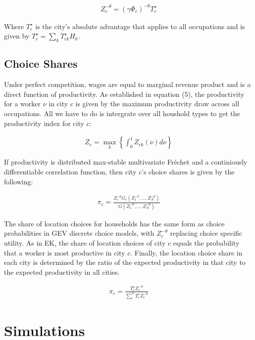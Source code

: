 \documentclass[10pt]{article}
\begin{document}
\begin{align}
    Z_c^{-\theta} = (\gamma \Phi_c)^{-\theta} T_c^{\star}
\end{align}

Where $T_c^{\star}$ is the city's absolute advantage that applies to all occupations and is given by $T_c^{\star} = \sum_{k}^{} T_{ck}^{\star} H_k$.

\subsection{Choice Shares}

Under perfect competition, wages are equal to marginal revenue product and is a direct function of productivity. As established in equation (5), the productivity for a worker $\nu$ in city $c$ is given by the maximum productivity draw across all occupations. All we have to do is intergrate over all houshold types to get the productivity index for city $c$:

\begin{align}
    Z_c = \max_k \left\{ \int_{0}^{1} Z_{ck} (\nu) d\nu \right\}
\end{align}

If productivity is distributed max-stable multivariate Fréchet and a continiously differentiable correlation function, then city $c$'s choice shares is given by the following:

\begin{align}
    \pi_c = \frac{Z_c^{-\theta} G_c(Z_1^{-\theta}, \dots, Z_N^{-\theta})}{G(Z_1^{-\theta}, \dots, Z_N^{-\theta})}
\end{align}

The share of location choices for households has the same form as choice probabilities in GEV discrete choice models, with $Z_c^{-\theta}$ replacing choice specific utility. As in EK, the share of location choices of city $c$ equals the probability that a worker is most productive in city $c$. Finally, the location choice share in each city is determined by the ratio of the expected productivity in that city to the expected productivity in all cities.

\begin{align}
    \pi_c = \frac{T_c^{\star} Z_c^{-\theta}}{\sum_{c}^{N} T_c^{\star} Z_c^{-\theta}}
\end{align}

\section{Simulations}
\end{document}
